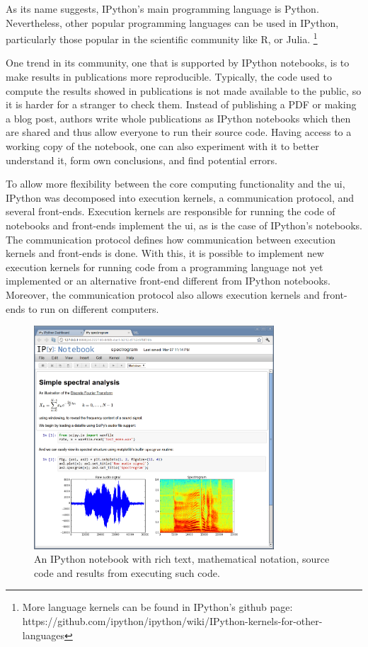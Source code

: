 As its name suggests, IPython's main programming language is Python.
Nevertheless, other popular programming languages can be used in IPython, particularly those popular in the scientific community like R, or Julia.%
\footnote{More language kernels can be found in IPython's github page: https://github.com/ipython/ipython/wiki/IPython-kernels-for-other-languages}

One trend in its community, one that is supported by IPython notebooks, is to make results in publications more reproducible.
Typically, the code used to compute the results showed in publications is not made available to the public, so it is harder for a stranger to check them.
Instead of publishing a PDF or making a blog post, authors write whole publications as IPython notebooks which then are shared and thus allow everyone to run their source code.
Having access to a working copy of the notebook, one can also experiment with it to better understand it, form own conclusions, and find potential errors.

To allow more flexibility between the core computing functionality and the \gls{ui}, IPython was decomposed into execution kernels, a communication protocol, and several front-ends.
Execution kernels are responsible for running the code of notebooks and front-ends implement the \gls{ui}, as is the case of IPython's notebooks.
The communication protocol defines how communication between execution kernels and front-ends is done.
With this, it is possible to implement new execution kernels for running code from a programming language not yet implemented or an alternative front-end different from IPython notebooks.
Moreover, the communication protocol also allows execution kernels and front-ends to run on different computers\cite{PER-GRA:2007}.

\begin{figure}
	\centering
	\includegraphics[width=0.8\textwidth]{images/ipython_notebook}
	\caption{An IPython notebook with rich text, mathematical notation, source code and results from executing such code.}
	\label{fig:ipython:notebook}
\end{figure}



